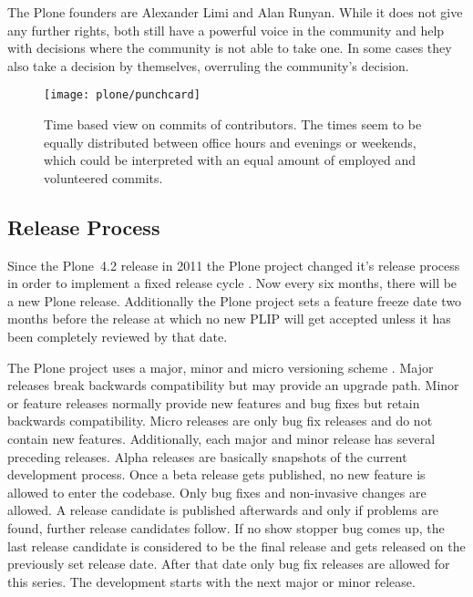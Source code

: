 The Plone founders are Alexander Limi and Alan Runyan. While it does not give
any further rights, both still have a powerful voice in the community and help
with decisions where the community is not able to take one. In some cases they
also take a decision by themselves, overruling the community's decision.

\begin{figure}[hbtp]
  \centering
  \texttt{[image: plone/punchcard]}
  \caption[Time Based View on Commits, Plone]
  {Time based view on commits of contributors. The times seem to be equally
    distributed between office hours and evenings or weekends, which could be
    interpreted with an equal amount of employed and volunteered commits.}
\end{figure}


\subsection{Release Process} %

Since the Plone~4.2 release in 2011 the Plone project changed it's release
process in order to implement a fixed release cycle
\cite{PloneFixedReleaseCycle}. Now every six months, there will be a new Plone
release. Additionally the Plone project sets a feature freeze date two months
before the release at which no new \ac{PLIP} will get accepted unless it has
been completely reviewed by that date.

The Plone project uses a major, minor and micro versioning scheme
\cite{PloneReleaseProcess,PloneCommunityProcesses}. Major releases break
backwards compatibility but may provide an upgrade path. Minor or feature
releases normally provide new features and bug fixes but retain backwards
compatibility. Micro releases are only bug fix releases and do not contain new
features. Additionally, each major and minor release has several preceding
releases. Alpha releases are basically snapshots of the current development
process. Once a beta release gets published, no new feature is allowed to enter
the codebase. Only bug fixes and non-invasive changes are allowed. A release
candidate is published afterwards and only if problems are found, further
release candidates follow. If no show stopper bug comes up, the last release
candidate is considered to be the final release and gets released on the
previously set release date. After that date only bug fix releases are allowed
for this series. The development starts with the next major or minor release.

